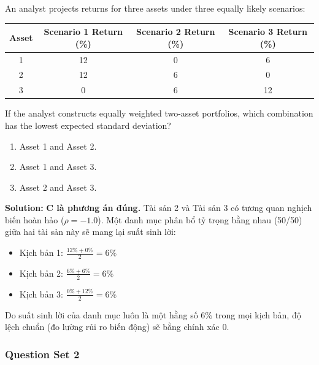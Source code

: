 \begin{tcolorbox}[
	colback=gray!5!white,
	colframe=black!15!white,
	boxrule=0.5pt,
	arc=3pt,
	title=\textbf{Question 5},
	coltitle=black,
	colbacktitle=black!5!white,
	before skip=6pt,
	after skip=6pt,
	breakable
]
An analyst projects returns for three assets under three equally likely scenarios:
\begin{center}
\begin{tabular}{c  c  c  c}
	\toprule
	\textbf{Asset} & \textbf{Scenario 1 Return (\%)} & \textbf{Scenario 2 Return (\%)} & \textbf{Scenario 3 Return (\%)} \\
	\midrule
	1 & 12 & 0 & 6 \\
	2 & 12 & 6 & 0 \\
	3 & 0 & 6 & 12 \\
	\bottomrule
\end{tabular}
\end{center}
If the analyst constructs equally weighted two-asset portfolios, which combination has the lowest expected standard deviation?
\begin{enumerate}[label=\Alph*.]
	\item Asset 1 and Asset 2.
	\item Asset 1 and Asset 3.
	\item Asset 2 and Asset 3.
\end{enumerate}

\textbf{Solution:}
\textbf{C là phương án đúng.} Tài sản 2 và Tài sản 3 có tương quan nghịch biến hoàn hảo ($\rho = -1.0$). Một danh mục phân bổ tỷ trọng bằng nhau (50/50) giữa hai tài sản này sẽ mang lại suất sinh lời:
\begin{itemize}
	\item Kịch bản 1: $\frac{12\% + 0\%}{2} = 6\%$
	\item Kịch bản 2: $\frac{6\% + 6\%}{2} = 6\%$
	\item Kịch bản 3: $\frac{0\% + 12\%}{2} = 6\%$
\end{itemize}
Do suất sinh lời của danh mục luôn là một hằng số $6\%$ trong mọi kịch bản, độ lệch chuẩn (đo lường rủi ro biến động) sẽ bằng chính xác 0.
\end{tcolorbox}

\subsubsection{Question Set 2}
\label{subsec:app_Question Set 2}

